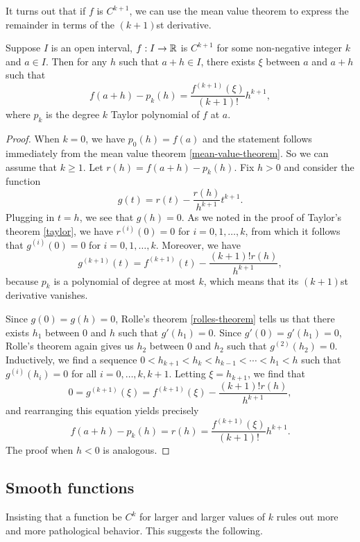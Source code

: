 It turns out that if $f$ is $C^{k+1}$, we can use the mean value theorem to express the remainder in terms of the $(k+1)$st derivative. 

\begin{theorem} \label{taylor-single-remainder-lagrange}
	Suppose $I$ is an open interval, $f : I \to \mathbb{R}$ is $C^{k+1}$ for some non-negative integer $k$ and $a \in I$. Then for any $h$ such that $a+h \in I$, there exists $\xi$ between $a$ and $a+h$ such that 
	\[ f(a+h) - p_k(h) = \frac{f^{(k+1)}(\xi)}{(k+1)!}h^{k+1}, \]
	where $p_k$ is the degree $k$ Taylor polynomial of $f$ at $a$. 
\end{theorem}

\begin{proof}
	When $k = 0$, we have $p_0(h) = f(a)$ and the statement follows immediately from the mean value theorem \ref{mean-value-theorem}. So we can assume that $k \geq 1$. Let $r(h) = f(a+h) - p_k(h)$. Fix $h > 0$ and consider the function
	\[ g(t) = r(t) - \frac{r(h)}{h^{k+1}} t^{k+1}.  \]
	Plugging in $t = h$, we see that $g(h) = 0$. As we noted in the proof of Taylor's theorem \ref{taylor}, we have $r^{(i)}(0) = 0$ for $i = 0, 1, \dotsc, k$, from which it follows that $g^{(i)}(0) = 0$ for $i = 0, 1, \dotsc, k$. Moreover, we have \[ g^{(k+1)}(t) = f^{(k+1)}(t) - \frac{(k+1)!r(h)}{h^{k+1}},  \]
	because $p_k$ is a polynomial of degree at most $k$, which means that its $(k+1)$st derivative vanishes. 
	
	Since $g(0) = g(h) = 0$, Rolle's theorem \ref{rolles-theorem} tells us that there exists $h_1$ between $0$ and $h$ such that $g'(h_1) = 0$. Since $g'(0) = g'(h_1) = 0$, Rolle's theorem again gives us $h_2$ between $0$ and $h_2$ such that $g^{(2)}(h_2) = 0$. Inductively, we find a sequence $0 < h_{k+1} < h_k < h_{k-1} < \dotsb < h_1 < h$ such that $g^{(i)}(h_i) = 0$ for all $i = 0, \dotsc, k, k+1$. Letting $\xi = h_{k+1}$, we find that 
	\[ 0 = g^{(k+1)}(\xi) = f^{(k+1)}(\xi) - \frac{(k+1)!r(h)}{h^{k+1}}, \]
	and rearranging this equation yields precisely
	\[ f(a+h) - p_k(h) = r(h) = \frac{f^{(k+1)}(\xi)}{(k+1)!}h^{k+1}. \]
	The proof when $h < 0$ is analogous. 
\end{proof}

\subsection{Smooth functions} \label{smooth-single}

Insisting that a function be $C^k$ for larger and larger values of $k$ rules out more and more pathological behavior. This suggests the following. 

